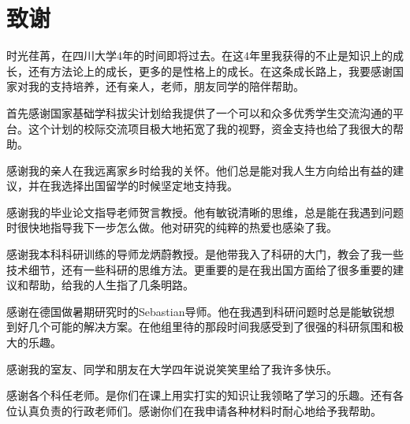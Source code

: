 \chapter{致谢}
时光荏苒，在四川大学4年的时间即将过去。在这4年里我获得的不止是知识上的成长，还有方法论上的成长，更多的是性格上的成长。在这条成长路上，我要感谢国家对我的支持培养，还有亲人，老师，朋友同学的陪伴帮助。

首先感谢国家基础学科拔尖计划给我提供了一个可以和众多优秀学生交流沟通的平台。这个计划的校际交流项目极大地拓宽了我的视野，资金支持也给了我很大的帮助。

感谢我的亲人在我远离家乡时给我的关怀。他们总是能对我人生方向给出有益的建议，并在我选择出国留学的时候坚定地支持我。

感谢我的毕业论文指导老师贺言教授。他有敏锐清晰的思维，总是能在我遇到问题时很快地指导我下一步怎么做。他对研究的纯粹的热爱也感染了我。

感谢我本科科研训练的导师龙炳蔚教授。是他带我入了科研的大门，教会了我一些技术细节，还有一些科研的思维方法。更重要的是在我出国方面给了很多重要的建议和帮助，给我的人生指了几条明路。

感谢在德国做暑期研究时的Sebastian导师。他在我遇到科研问题时总是能敏锐想到好几个可能的解决方案。在他组里待的那段时间我感受到了很强的科研氛围和极大的乐趣。

感谢我的室友、同学和朋友在大学四年说说笑笑里给了我许多快乐。

感谢各个科任老师。是你们在课上用实打实的知识让我领略了学习的乐趣。还有各位认真负责的行政老师们。感谢你们在我申请各种材料时耐心地给予我帮助。